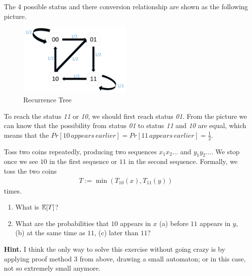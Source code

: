 \documentclass[12pt,a4]{article}
\begin{document}
\begin{solution}
The 4 possible status and there conversion relationship are shown as the following picture.
\begin{figure}[htbp]
    \centering
    \includegraphics[width=0.5\textwidth]{figures/1.jpg}
    \caption{Recurrence Tree}\label{tree}
\end{figure}
To reach the status \textit{11} or \textit{10}, we should first reach status \textit{01}. From the picture we can know that the possibility from status \textit{01} to status \textit{11} and \textit{10} are equal, which means that the $Pr[10 \, appears \, earlier]=Pr[11 \, appears \,  earlier]=\frac{1}{2}$.
\end{solution}

\begin{exercise}
   Toss two coins repeatedly, producing two sequences $x_1 x_2 \dots$ and $y_1 y_2 \dots$.
   We stop once we see $10$ in the first sequence or $11$ in the second sequence. Formally,
   we toss the two coins
   \begin{align*}
      T:=  \min (T_{10}(x), T_{11}(y)) 
   \end{align*}   
   times.
   \begin{enumerate}
     \item What is $\mathbb{E}[T]$?
     \item What are the probabilities that $10$ appears in $x$ (a) before $11$ appears in $y$, (b) at the same time as $11$,
     (c) later than $11$?
     \end{enumerate}
     \textbf{Hint.} I think the only way to solve this exercise without going crazy is by applying proof method 3 
     from above, drawing a small automaton; or in this case, not so extremely small anymore.
\end{exercise}
\end{document}
